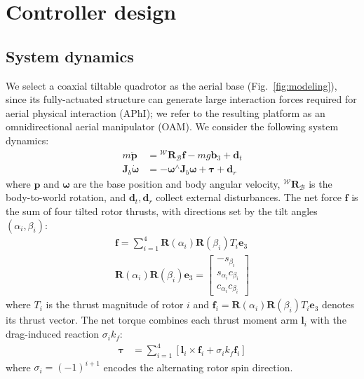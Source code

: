 \documentclass[letterpaper, 10 pt, conference]{ieeeconf}  %
\begin{document}
\section{Controller design}
\label{sec:controller}

\subsection{System dynamics}
We select a coaxial tiltable quadrotor as the aerial base (Fig.~\ref{fig:modeling}), since its fully-actuated structure can generate large interaction forces required for aerial physical interaction (APhI); we refer to the resulting platform as an omnidirectional aerial manipulator (OAM). We consider the following system dynamics:
\begin{equation}
\label{eq:system_dynamics}
\begin{aligned}
m\ddot{\boldsymbol{p}}
&=
{}^{\mathcal{W}}\!\boldsymbol{R}_{\mathcal{B}}\boldsymbol{f}
-
mg\boldsymbol{b}_3
+
\boldsymbol{d}_t
\\
\boldsymbol{J}_b \dot{\boldsymbol{\omega}}
&=
-
\boldsymbol{\omega}^{\wedge}
\boldsymbol{J}_b
\boldsymbol{\omega}
+
\boldsymbol{\tau}
+
\boldsymbol{d}_r
\end{aligned}
\end{equation}
where $\boldsymbol{p}$ and $\boldsymbol{\omega}$ are the base position and body angular velocity, ${}^{\mathcal{W}}\!\boldsymbol{R}_{\mathcal{B}}$ is the body-to-world rotation, and $\boldsymbol{d}_t,\boldsymbol{d}_r$ collect external disturbances. The net force $\boldsymbol{f}$ is the sum of four tilted rotor thrusts, with directions set by the tilt angles $(\alpha_i,\beta_i)$:
\begin{equation}
\label{eq:total_force}
\begin{gathered}
\boldsymbol{f}
=
\sum_{i=1}^{4}
\boldsymbol{R}(\alpha_i)
\boldsymbol{R}(\beta_i)
T_i
\boldsymbol{e}_3
\\
\boldsymbol{R}(\alpha_i)
\boldsymbol{R}(\beta_i)
\boldsymbol{e}_3
=
\begin{bmatrix}
-s_{\beta_i}\\
s_{\alpha_i}c_{\beta_i}\\
c_{\alpha_i}c_{\beta_i}
\end{bmatrix}
\end{gathered}
\end{equation}
where $T_i$ is the thrust magnitude of rotor $i$ and $\boldsymbol{f}_i=\boldsymbol{R}(\alpha_i)\boldsymbol{R}(\beta_i)T_i\boldsymbol{e}_3$ denotes its thrust vector. The net torque combines each thrust moment arm $\boldsymbol{l}_i$ with the drag-induced reaction $\sigma_i k_f$:
\begin{equation}
\label{eq:total_torque}
\begin{aligned}
\boldsymbol{\tau}
&=
\sum_{i=1}^{4}
\left[
\boldsymbol{l}_i \times \boldsymbol{f}_i
+
\sigma_i k_f \boldsymbol{f}_i
\right]
\end{aligned}
\end{equation}
where $\sigma_i=(-1)^{i+1}$ encodes the alternating rotor spin direction.
\end{document}
